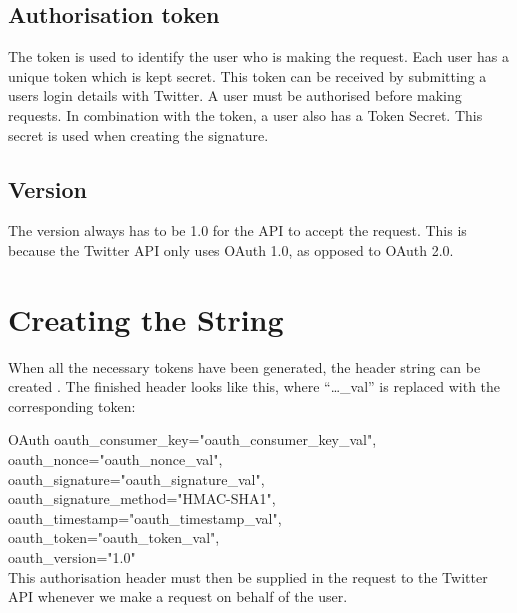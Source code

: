 \subsection*{Authorisation token}
The token is used to identify the user who is making the request. Each user has
a unique token which is kept secret. This token can be received by submitting a
users login details with Twitter. A user must be authorised before making
requests. In combination with the token, a user also has a Token Secret. This
secret is used when creating the signature.


\subsection*{Version}
The version always has to be 1.0 for the API to accept the request. This is
because the Twitter \ac{API} only uses OAuth 1.0, as opposed to OAuth 2.0.

\section{Creating the String}\label{label:stringCreate}
When all the necessary tokens have been generated, the 
header string can be created \citep{TwitterAPIAuth}. The finished header
looks like this, where ``\ldots\_val'' is replaced with the corresponding token:\nl

OAuth oauth\_consumer\_key="oauth\_consumer\_key\_val",\\
oauth\_nonce="oauth\_nonce\_val", \\
oauth\_signature="oauth\_signature\_val", \\
oauth\_signature\_method="HMAC-SHA1", \\
oauth\_timestamp="oauth\_timestamp\_val", \\
oauth\_token="oauth\_token\_val", \\
oauth\_version="1.0" \\

This authorisation header must then be supplied in the request to the Twitter
API whenever we make a request on behalf of the user.
